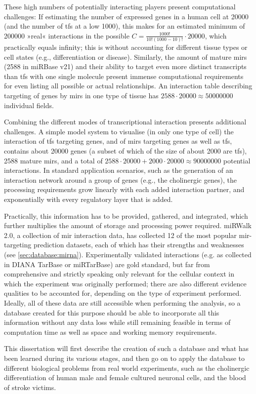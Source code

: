 These high numbers of potentially interacting players present computational challenges: If estimating the number of expressed genes in a human cell at \num{20000} (and the number of \acp{tf} at a low 1000), this makes for an estimated minimum of \num{200000} »real« interactions in the possible $ C = \frac{1000!}{10!(1000-10)!} \cdot \num{20000} $, which practically equals infinity; this is without accounting for different tissue types or cell states (e.g., differentiation or disease). Similarly, the amount of mature \acp{mir} (2588 in miRBase v21) and their ability to target even more distinct transcripts than \acp{tf} with one single molecule present immense computational requirements for even listing all possible or actual relationships. An interaction table describing targeting of genes by \acp{mir} in one type of tissue has $ 2588 \cdot \num{20000} \approx \num{50000000} $ individual fields.

Combining the different modes of transcriptional interaction presents additional challenges. A simple model system to visualise (in only one type of cell) the interaction of \acp{tf} targeting genes, and of \acp{mir} targeting genes as well as \acp{tf}, contains about \num{20000} genes (a subset of which of the size of about 2000 are \acp{tf}), 2588 mature \acp{mir}, and a total of $ 2588 \cdot \num{20000} + 2000 \cdot \num{20000} \approx \num{90000000} $ potential interactions. In standard application scenarios, such as the generation of an interaction network around a group of genes (e.g., the cholinergic genes), the processing requirements grow linearly with each added interaction partner, and exponentially with every regulatory layer that is added. 

Practically, this information has to be provided, gathered, and integrated, which further multiplies the amount of storage and processing power required. miRWalk 2.0, a collection of \ac{mir} interaction data, has collected 12 of the most popular \ac{mir}-targeting prediction datasets, each of which has their strengths and weaknesses (see \ref{sec:database:mirna}). Experimentally validated interactions (e.g. as collected in DIANA TarBase or miRTarBase) are gold standard, but far from comprehensive and strictly speaking only relevant for the cellular context in which the experiment was originally performed; there are also different evidence qualities to be accounted for, depending on the type of experiment performed. Ideally, all of these data are still accessible when performing the analysis, so a database created for this purpose should be able to incorporate all this information without any data loss while still remaining feasible in terms of computation time as well as space and working memory requirements. 

This dissertation will first describe the creation of such a database and what has been learned during its various stages, and then go on to apply the database to different biological problems from real world experiments, such as the cholinergic differentiation of human male and female cultured neuronal cells, and the blood of stroke victims.